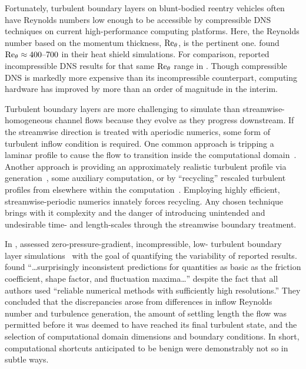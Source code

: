 Fortunately, turbulent boundary layers on blunt-bodied reentry vehicles often
have Reynolds numbers low enough to be accessible by compressible DNS techniques
on current high-performance computing platforms.  Here, the Reynolds number
based on the momentum thickness, $\Reynolds[\theta]{}$, is the pertinent one.
\citet{Bauman2011Loose} found $\Reynolds[\theta]{} \approx 400\text{--}700$ in
their heat shield simulations.  For comparison, \citet{Komminaho2002Reynolds}
reported incompressible DNS results for that same $\Reynolds[\theta]{}$ range in
\citeyear{Komminaho2002Reynolds}.  Though compressible DNS is markedly more
expensive than its incompressible counterpart, computing hardware has improved
by more than an order of magnitude in the interim.

Turbulent boundary layers are more challenging to simulate than
streamwise-homogeneous channel flows because they evolve as they progress
downstream.  If the streamwise direction is treated with aperiodic numerics,
some form of turbulent inflow condition is required.  One common approach is
tripping a laminar profile to cause the flow to transition inside the
computational domain~\citep{Wu1999Simulation}.  Another approach is providing
an approximately realistic turbulent profile via
generation~\citep[e.g.][]{Lund1998Generation}, some auxiliary computation, or
by ``recycling'' rescaled turbulent profiles from elsewhere within the
computation~\citep{Simens2009Highresolution}.  Employing highly efficient,
streamwise-periodic numerics innately forces recycling.  Any chosen technique
brings with it complexity and the danger of introducing unintended
and undesirable
time- and length-scales through the streamwise boundary treatment.

In \citeyear{Schlatter2010Assessment}, \citet{Schlatter2010Assessment} assessed
zero-pressure-gradient, incompressible, low-\Reynolds{} turbulent boundary layer
simulations~\citep{Spalart1988Direct, Komminaho2002Reynolds, Khujadze2007New,
Khujadze2004DNS, Ferrante2005Reynolds, Simens2009Highresolution, Wu2009Direct,
Schlatter2009High, Schlatter2009Turbulent} with the goal of quantifying the
variability of reported results.  \citeauthor{Schlatter2010Assessment} found
``\dots{}surprisingly inconsistent predictions for quantities as basic as the
friction coefficient, shape factor, and fluctuation maxima\dots{}'' despite the
fact that all authors used ``reliable numerical methods with sufficiently high
resolutions.''  They concluded that the discrepancies arose from differences in
inflow Reynolds number and turbulence generation, the amount of settling length
the flow was permitted before it was deemed to have reached its final turbulent
state, and the selection of computational domain dimensions and boundary
conditions.  In short, computational shortcuts anticipated to be benign were
demonstrably not so in subtle ways.

